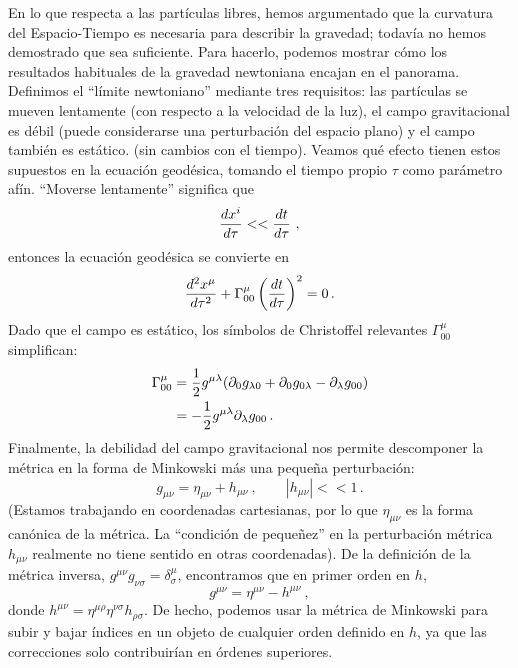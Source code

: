 \documentclass[11pt,b5paper,openany,twoside]{book}
\newcommand{\mn}{{\mu\nu}}
\newcommand{\p}[1]{{\partial_{#1}}}
\begin{document}
En lo que respecta a las partículas libres, hemos argumentado que la curvatura del Espacio-Tiempo es necesaria para describir la gravedad; todavía no hemos demostrado que sea suficiente.
Para hacerlo, podemos mostrar cómo los resultados habituales de la gravedad newtoniana encajan en el panorama.
Definimos el ``límite newtoniano'' mediante tres requisitos: las partículas se mueven lentamente (con respecto a la velocidad de la luz), el campo gravitacional es débil (puede considerarse una perturbación del espacio plano) y el campo también es estático. (sin cambios con el tiempo).
Veamos qué efecto tienen estos supuestos en la ecuación geodésica, tomando el tiempo propio $\tau$ como parámetro afín.
``Moverse lentamente'' significa que
\begin{equation}
{{dx^i}\over{d\tau}}<<{{dt}\over{d\tau}}\ ,\label{4.10}
\end{equation}
entonces la ecuación geodésica se convierte en
\begin{equation}
{{d^2 x^\mu}\over{d\tau^2}}+\Gamma^\mu_{00}
\left({{d t}\over{d\tau}}\right)^2 = 0\,.
\label{4.11}
\end{equation}
Dado que el campo es estático, los símbolos de Christoffel relevantes $\Gamma^\mu_{00}$ simplifican:
\begin{align}
\Gamma^\mu_{00} &=  {1\over 2} g^{\mu\lambda}
(\p0 g_{\lambda 0} + \p0 g_{0 \lambda} - \p\lambda g_{00}) \notag \\
&=  - {1\over 2} g^{\mu\lambda}\p\lambda g_{00}\,. \label{4.12}
\end{align}
Finalmente, la debilidad del campo gravitacional nos permite descomponer la métrica en la forma de Minkowski más una pequeña perturbación:
\begin{equation}
g_\mn = \eta_\mn + h_\mn\ ,\qquad |h_\mn |<<1\,.\label{4.13}
\end{equation}
(Estamos trabajando en coordenadas cartesianas, por lo que $\eta_\mn$ es la forma canónica de la métrica.
La ``condición de pequeñez'' en la perturbación métrica $h_\mn$ realmente no tiene sentido en otras coordenadas).
De la definición de la métrica inversa, $g^\mn g_{\nu\sigma}=\delta^\mu_\sigma$, encontramos que en primer orden en $h$,
\begin{equation}
g^\mn = \eta^\mn - h^\mn\ ,\label{4.14}
\end{equation}
donde $h^\mn = \eta^{\mu\rho}\eta^{\nu\sigma}h_{\rho\sigma}$.
De hecho, podemos usar la métrica de Minkowski para subir y bajar índices en un objeto de cualquier orden definido en $h$, ya que las correcciones solo contribuirían en órdenes superiores.
\end{document}

